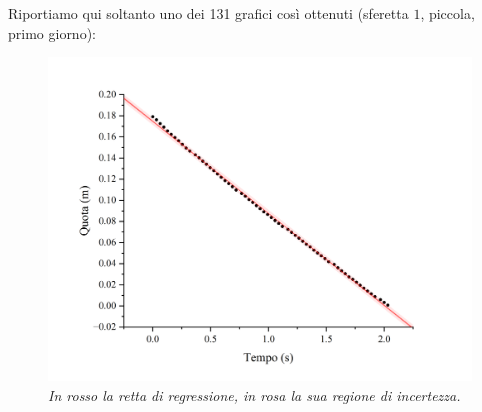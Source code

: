 \documentclass{article}
\begin{document}
Riportiamo qui soltanto uno dei 131 grafici così ottenuti
(sferetta $1$, piccola, primo giorno):
\begin{figure}[H]
  \centering
  \includegraphics[trim={1.5cm 0.6cm 2cm 1cm},clip,width=\textwidth]{img/reg-p.png}
  \caption{\emph{
    In rosso la retta di regressione, in rosa la sua regione di incertezza.
  }}
\end{figure}
\end{document}

